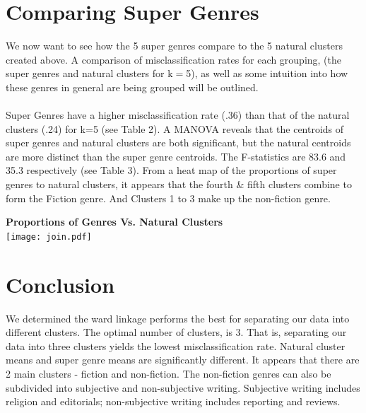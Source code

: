 \documentclass[11pt]{article}
\begin{document}
\section*{Comparing Super Genres}
We now want to see how the 5 super genres compare to the 5 natural clusters
created above. A comparison of misclassification rates for each grouping, (the
super genres and natural clusters for k$=$5), as well as some intuition into
how these genres in general are being grouped will be outlined.
\\
\\
Super Genres have a higher misclassification rate (.36) than that of the
natural clusters (.24) for k=5 (see Table 2). A MANOVA reveals that the
centroids of super genres and natural clusters are both significant, but the
natural centroids are more distinct than the super genre centroids. The
F-statistics are 83.6 and 35.3 respectively (see Table 3). From a heat map of
the proportions of super genres to natural clusters, it appears that the fourth
\& fifth clusters combine to form the Fiction genre. And Clusters 1 to 3 make
up the non-fiction genre.



\begin{center}
  \textbf{Proportions of Genres Vs. Natural Clusters}\\
  \texttt{[image: join.pdf]}
\end{center}

\section*{Conclusion}
We determined the ward linkage performs the best for separating our data into 
different clusters. The optimal number of clusters, is 3. That is, separating 
our data into three clusters yields the lowest misclassification rate. 
Natural cluster means and super genre means are significantly different.
It appears that there are 2 main clusters - fiction and non-fiction. 
The non-fiction genres can also be subdivided into subjective and non-subjective 
writing. Subjective writing includes religion and editorials; non-subjective 
writing includes reporting and reviews.
\end{document}
